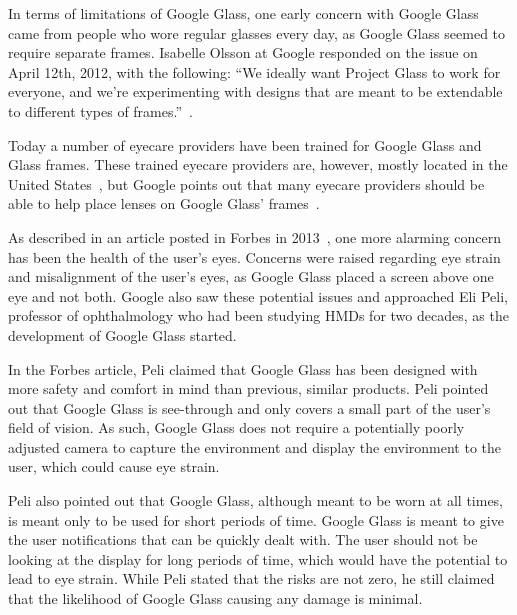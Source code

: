 In terms of limitations of Google Glass, one early concern with Google Glass came from people who wore regular glasses every day, as Google Glass seemed to require separate frames. Isabelle Olsson at Google responded on the issue on April 12th, 2012, with the following: ``We ideally want Project Glass to work for everyone, and we're experimenting with designs that are meant to be extendable to different types of frames.''~\cite{GoogleGlassFrameResponse}.

Today a number of eyecare providers have been trained for Google Glass and Glass frames. These trained eyecare providers are, however, mostly located in the United States~\cite{frameProviders}, but Google points out that many eyecare providers should be able to help place lenses on Google Glass' frames~\cite{framesGlass}.

As described in an article posted in Forbes in 2013~\cite{ackerman13}, one more alarming concern has been the health of the user's eyes. Concerns were raised regarding eye strain and misalignment of the user's eyes, as Google Glass placed a screen above one eye and not both. Google also saw these potential issues and approached Eli Peli, professor of ophthalmology who had been studying HMDs for two decades, as the development of Google Glass started.

In the Forbes article, Peli claimed that Google Glass has been designed with more safety and comfort in mind than previous, similar products. Peli pointed out that Google Glass is see-through and only covers a small part of the user's field of vision. As such, Google Glass does not require a potentially poorly adjusted camera to capture the environment and display the environment to the user, which could cause eye strain.

Peli also pointed out that Google Glass, although meant to be worn at all times, is meant only to be used for short periods of time. Google Glass is meant to give the user notifications that can be quickly dealt with. The user should not be looking at the display for long periods of time, which would have the potential to lead to eye strain. While Peli stated that the risks are not zero, he still claimed that the likelihood of Google Glass causing any damage is minimal.

